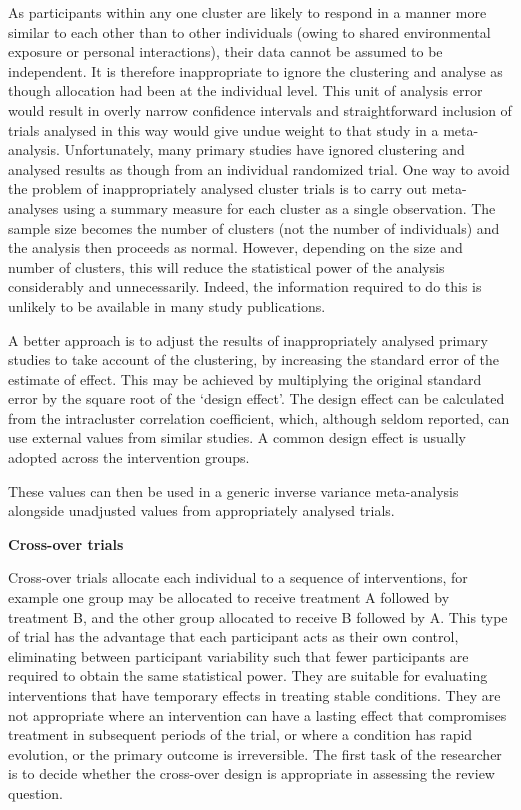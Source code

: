 \documentclass[
  10pt,
  a4paper,
  DIV=11,
  numbers=noendperiod]{scrreprt}
\begin{document}
As participants within any one cluster are likely to respond in a manner
more similar to each other than to other individuals (owing to shared
environmental exposure or personal interactions), their data cannot be
assumed to be independent. It is therefore inappropriate to ignore the
clustering and analyse as though allocation had been at the individual
level. This unit of analysis error would result in overly narrow
confidence intervals and straightforward inclusion of trials analysed in
this way would give undue weight to that study in a meta-analysis.
Unfortunately, many primary studies have ignored clustering and analysed
results as though from an individual randomized trial. One way to avoid
the problem of inappropriately analysed cluster trials is to carry out
meta-analyses using a summary measure for each cluster as a single
observation. The sample size becomes the number of clusters (not the
number of individuals) and the analysis then proceeds as normal.
However, depending on the size and number of clusters, this will reduce
the statistical power of the analysis considerably and unnecessarily.
Indeed, the information required to do this is unlikely to be available
in many study publications.

A better approach is to adjust the results of inappropriately analysed
primary studies to take account of the clustering, by increasing the
standard error of the estimate of effect. This may be achieved by
multiplying the original standard error by the square root of the
`design effect'. The design effect can be calculated from the
intracluster correlation coefficient, which, although seldom reported,
can use external values from similar studies. A common design effect is
usually adopted across the intervention groups.

These values can then be used in a generic inverse variance
meta-analysis alongside unadjusted values from appropriately analysed
trials.

\textbf{Cross-over trials}

Cross-over trials allocate each individual to a sequence of
interventions, for example one group may be allocated to receive
treatment A followed by treatment B, and the other group allocated to
receive B followed by A. This type of trial has the advantage that each
participant acts as their own control, eliminating between participant
variability such that fewer participants are required to obtain the same
statistical power. They are suitable for evaluating interventions that
have temporary effects in treating stable conditions. They are not
appropriate where an intervention can have a lasting effect that
compromises treatment in subsequent periods of the trial, or where a
condition has rapid evolution, or the primary outcome is irreversible.
The first task of the researcher is to decide whether the cross-over
design is appropriate in assessing the review question.
\end{document}
